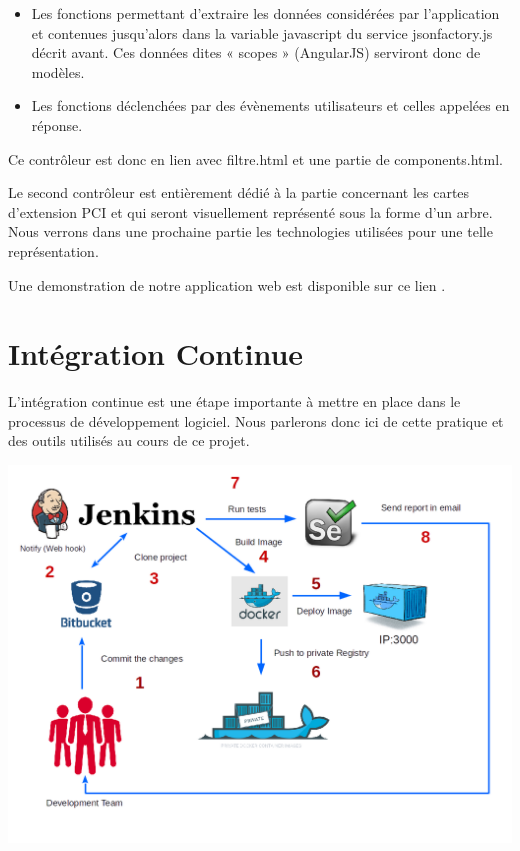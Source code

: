 \documentclass [a4paper,11pt]{article}
\begin{document}
\begin{itemize}
 \item Les fonctions permettant d’extraire les données considérées par l’application et contenues jusqu’alors dans la variable javascript du service jsonfactory.js décrit avant. Ces données dites « scopes » (AngularJS) serviront donc de modèles.
 \item Les fonctions déclenchées par des évènements utilisateurs et celles appelées en réponse.
 \newline
\end{itemize}

Ce contrôleur est donc en lien avec filtre.html et une partie de components.html.
\newline

Le second contrôleur est entièrement dédié à la partie concernant les cartes d’extension PCI et qui seront visuellement représenté sous la forme d’un arbre. Nous verrons dans une prochaine partie les technologies utilisées pour une telle représentation.
\newline

Une demonstration de notre application web est disponible sur ce lien \cite{APPLI}.

\section{Intégration Continue}

L'intégration continue est une étape importante à mettre en place dans le processus de développement logiciel. Nous parlerons donc ici de cette pratique et des outils utilisés au cours de ce projet.

\begin{center}
\includegraphics[scale=0.5]{img/ci.png}
\end{center}
\end{document}
